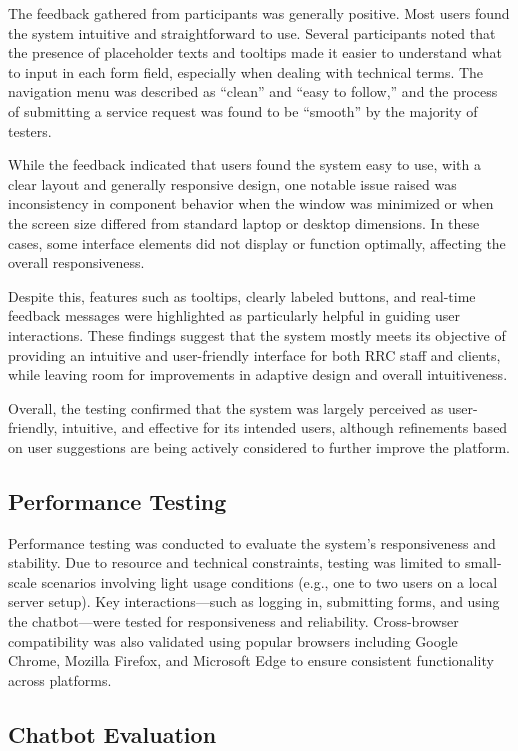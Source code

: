The feedback gathered from participants was generally positive. Most users found the system intuitive and straightforward to use. Several participants noted that the presence of placeholder texts and tooltips made it easier to understand what to input in each form field, especially when dealing with technical terms. The navigation menu was described as “clean” and “easy to follow,” and the process of submitting a service request was found to be “smooth” by the majority of testers.

While the feedback indicated that users found the system easy to use, with a clear layout and generally responsive design, one notable issue raised was inconsistency in component behavior when the window was minimized or when the screen size differed from standard laptop or desktop dimensions. In these cases, some interface elements did not display or function optimally, affecting the overall responsiveness.

Despite this, features such as tooltips, clearly labeled buttons, and real-time feedback messages were highlighted as particularly helpful in guiding user interactions. These findings suggest that the system mostly meets its objective of providing an intuitive and user-friendly interface for both RRC staff and clients, while leaving room for improvements in adaptive design and overall intuitiveness.

Overall, the testing confirmed that the system was largely perceived as user-friendly, intuitive, and effective for its intended users, although refinements based on user suggestions are being actively considered to further improve the platform.

\subsection{Performance Testing}

Performance testing was conducted to evaluate the system's responsiveness and stability. Due to resource and technical constraints, testing was limited to small-scale scenarios involving light usage conditions (e.g., one to two users on a local server setup). Key interactions—such as logging in, submitting forms, and using the chatbot—were tested for responsiveness and reliability. Cross-browser compatibility was also validated using popular browsers including Google Chrome, Mozilla Firefox, and Microsoft Edge to ensure consistent functionality across platforms.

\subsection{Chatbot Evaluation}

